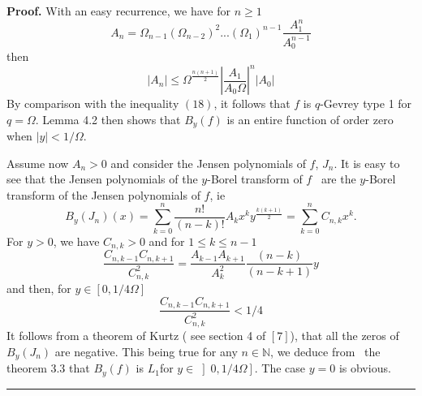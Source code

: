 \documentclass{article}
\newenvironment{proof}[1][Proof]{\textbf{#1.} }{\ \rule{0.5em}{0.5em}}
\begin{document}
\begin{proof}
\bigskip With an easy recurrence, we have for $n\geq 1$\begin{equation*}
A_{n}=\Omega _{n-1}\left( \Omega _{n-2}\right) ^{2}...\left( \Omega
_{1}\right) ^{n-1}\dfrac{A_{1}^{n}}{A_{0}^{n-1}}
\end{equation*}
then 
\begin{equation*}
\left| A_{n}\right| \leq \Omega ^{\tfrac{n\left( n+1\right) }{2}}\left| 
\dfrac{A_{1}}{A_{0}\Omega }\right| ^{n}\left| A_{0}\right| 
\end{equation*}
By comparison with the inequality $\left( 18\right) $, it follows that $f$
is $q$-Gevrey type 1 for $q=\Omega $. Lemma 4.2 then shows that $B_{y}\left(
f\right) $ is an entire function of order zero when $\left| y\right|
<1/\Omega $.

Assume now $A_{n}>0$ and consider the Jensen polynomials of $f$, $J_{n}$. It
is easy to see that the Jensen polynomials of the $y$-Borel transform of $f$
\ are the $y$-Borel transform of the Jensen polynomials of $f$, ie 
\begin{equation}
B_{y}\left( J_{n}\right) \left( x\right) =\sum\limits_{k=0}^{n}\dfrac{n!}{\left( n-k\right) !}A_{k}x^{k}y^{\tfrac{k\left( k+1\right) }{2}}=\sum\limits_{k=0}^{n}C_{n,k}x^{k}\text{.}
\end{equation}
For $y>0$, we have $C_{n,k}>0$ and for $1\leq k\leq n-1$\begin{equation*}
\dfrac{C_{n,k-1}C_{n,k+1}}{C_{n,k}^{2}}=\dfrac{A_{k-1}A_{k+1}}{A_{k}^{2}}\dfrac{\left( n-k\right) }{\left( n-k+1\right) }y
\end{equation*}
and then, for $y\in \left[ 0,1/4\Omega \right] $ 
\begin{equation*}
\dfrac{C_{n,k-1}C_{n,k+1}}{C_{n,k}^{2}}<1/4
\end{equation*}
It follows from a theorem of Kurtz ( see section 4 of $\left[ 7\right] $),
\bigskip that all the zeros of $B_{y}\left( J_{n}\right) $ are negative.
This being true for any $n\in \mathbb{N}$, we deduce from \ the theorem 3.3
that $B_{y}\left( f\right) $ is $L_{1}$for $y\in \left] 0,1/4\Omega \right] $. The case $y=0$ is obvious.
\end{proof}

\bigskip
\end{document}
